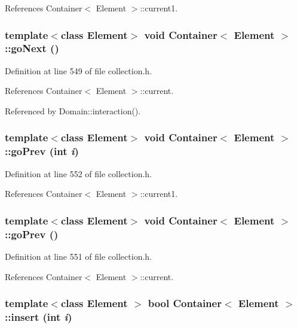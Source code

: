 References Container$<$ Element $>$::current1.\hypertarget{classContainer_e72c7b7cbc6c1478505d1f919e565d11}{
\subsubsection[{goNext}]{\setlength{\rightskip}{0pt plus 5cm}template$<$class Element$>$ void {\bf Container}$<$ Element $>$::goNext ()}}
\label{classContainer_e72c7b7cbc6c1478505d1f919e565d11}




Definition at line 549 of file collection.h.

References Container$<$ Element $>$::current.

Referenced by Domain::interaction().\hypertarget{classContainer_e8b99ee9fa0ef149f68c7dd44bddc48e}{
\subsubsection[{goPrev}]{\setlength{\rightskip}{0pt plus 5cm}template$<$class Element$>$ void {\bf Container}$<$ Element $>$::goPrev (int {\em i})}}
\label{classContainer_e8b99ee9fa0ef149f68c7dd44bddc48e}




Definition at line 552 of file collection.h.

References Container$<$ Element $>$::current1.\hypertarget{classContainer_b4adc89822cc419ca17790065c0d0726}{
\subsubsection[{goPrev}]{\setlength{\rightskip}{0pt plus 5cm}template$<$class Element$>$ void {\bf Container}$<$ Element $>$::goPrev ()}}
\label{classContainer_b4adc89822cc419ca17790065c0d0726}




Definition at line 551 of file collection.h.

References Container$<$ Element $>$::current.\hypertarget{classContainer_a03b6cfdbb0d2d9065ef4b9d909d9408}{
\subsubsection[{insert}]{\setlength{\rightskip}{0pt plus 5cm}template$<$class Element $>$ bool {\bf Container}$<$ Element $>$::insert (int {\em i})}}
\label{classContainer_a03b6cfdbb0d2d9065ef4b9d909d9408}




